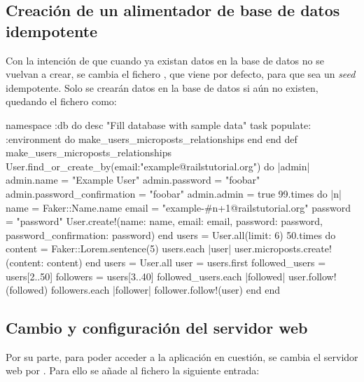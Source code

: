 
\subsection{Creación de un alimentador de base de datos idempotente}

Con la intención de que cuando ya existan datos en la base de datos no se vuelvan a crear, se cambia el fichero , que viene por defecto, para que sea un \textit{seed} idempotente. Solo se crearán datos en la base de datos si aún no existen, quedando el fichero como:

\begin{codelisting}
\label{code:idempotentseed}
\begin{code}
namespace :db do
  desc "Fill database with sample data"
  task populate: :environment do
    make_users_microposts_relationships
  end
end
def make_users_microposts_relationships
  User.find_or_create_by(email:"example@railstutorial.org") do |admin| 
  	admin.name = "Example User"
	admin.password = "foobar"
        admin.password_confirmation = "foobar"
        admin.admin = true
	99.times do |n|
	    name  = Faker::Name.name
	    email = "example-#{n+1}@railstutorial.org"
	    password  = "password"
	    User.create!(name:     name,
                 email:    email,
                 password: password,
                 password_confirmation: password)
        end
	users = User.all(limit: 6)
  	50.times do
	    content = Faker::Lorem.sentence(5)
	    users.each { |user| user.microposts.create!(content: content) }
	end  
	users = User.all
	user  = users.first
	followed_users = users[2..50]
	followers      = users[3..40]
	followed_users.each { |followed| user.follow!(followed) }
	followers.each      { |follower| follower.follow!(user) }
  end
end
\end{code}
\end{codelisting}

\subsection{Cambio y configuración del servidor web}

Por su parte, para poder acceder a la aplicación en cuestión, se cambia el servidor web  por . Para ello se añade al fichero  la siguiente entrada:

